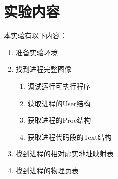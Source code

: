\section{实验内容}
本实验有以下内容：
\begin{enumerate}
    \item 准备实验环境
    \item 找到进程完整图像
    \begin{enumerate}
        \item 调试运行可执行程序
        \item 获取进程的User结构
        \item 获取进程的Proc结构
        \item 获取进程代码段的Text结构
    \end{enumerate}
    \item 找到进程的相对虚实地址映射表
    \item 找到进程的物理页表
\end{enumerate}